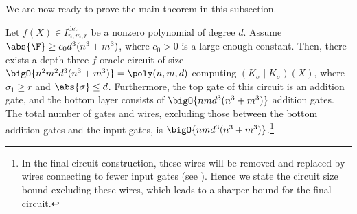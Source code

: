 \documentclass[letterpaper, 11pt]{amsart}
\begin{document}
We are now ready to prove the main theorem in this subsection.

\begin{thrm}\label{thrm:bideterminant_canonical_extraction}
    Let $f(X) \in I^{\det}_{n, m, r}$ be a nonzero polynomial of degree $d$.
    Assume $\abs{\F} \geq c_0 d^3(n^3+m^3)$, where $c_0>0$ is a large enough constant.
    Then, there exists a depth-three $f$-oracle circuit of size $\bigO{n^2m^2d^3(n^3+m^3)} = \poly(n,m,d)$ computing $(K_\sigma \mid K_\sigma)(X)$, where $\sigma_1 \geq r$ and $\abs{\sigma} \leq d$.
    Furthermore, the top gate of this circuit is an addition gate, and the bottom layer consists of $\bigO{nmd^3(n^3+m^3)}$ addition gates.
    The total number of gates and wires, excluding those between the bottom addition gates and the input gates, is $\bigO{nmd^3(n^3+m^3)}$.\footnote{In the final circuit construction, these wires will be removed and replaced by wires connecting to fewer input gates (see ).
    Hence we state the circuit size bound excluding these wires, which leads to a sharper bound for the final circuit.}
\end{thrm}
\end{document}
